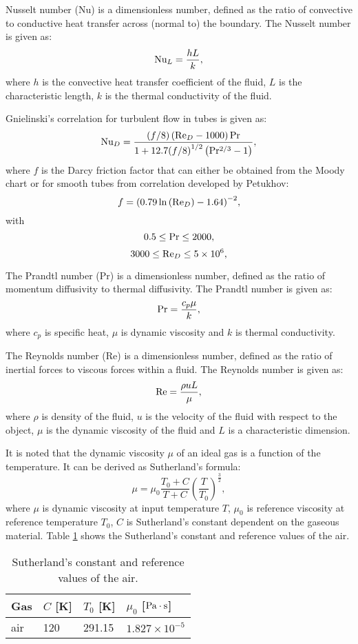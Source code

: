 Nusselt number (Nu) is a dimensionless number, defined as the ratio of convective to conductive heat transfer across (normal to) the boundary.
The Nusselt number is given as:
\[{\rm{N}}{{\rm{u}}_L} = \frac{{hL}}{k},\]
where $h$ is the convective heat transfer coefficient of the fluid, $L$ is the characteristic length, $k$ is the thermal conductivity of the fluid.

Gnielinski's correlation for turbulent flow in tubes is given as:
\[{\rm{N}}{{\rm{u}}_D} = \frac{{\left( {f/8} \right)\left( {{\rm{R}}{{\rm{e}}_D} - 1000} \right){\rm{Pr}}}}{{1 + 12.7{{(f/8)}^{1/2}}\left( {{\rm{P}}{{\rm{r}}^{2/3}} - 1} \right)}},\]
where $f$ is the Darcy friction factor that can either be obtained from the Moody chart or for smooth tubes from correlation developed by Petukhov:
\[f = {\left( {0.79\ln \left( {{\rm{R}}{{\rm{e}}_D}} \right) - 1.64} \right)^{ - 2}},\]
with
\[0.5 \le {\rm{Pr}} \le 2000,\]
\[3000 \le {\rm{R}}{{\rm{e}}_D} \le 5 \times {10^6},\]

The Prandtl number (Pr) is a dimensionless number, defined as the ratio of momentum diffusivity to thermal diffusivity.
The Prandtl number is given as:
\[{\rm{Pr}} = \frac{{{c_p}\mu }}{k},\]
where
$c_{p}$ is specific heat, $\mu$ is dynamic viscosity and $k$ is thermal conductivity.

The Reynolds number (Re) is a dimensionless number, defined as the ratio of inertial forces to viscous forces within a fluid.
The Reynolds number is given as:
\[{\rm{Re}} = \frac{{\rho uL}}{\mu },\]
where
$\rho$ is density of the fluid, $u$ is the velocity of the fluid with respect to the object, $\mu$ is the dynamic viscosity of the fluid and $L$ is a characteristic dimension.

It is noted that the dynamic viscosity $\mu$ of an ideal gas is a function of the temperature. It can be derived as Sutherland's formula:
\[\mu  = {\mu _0}\frac{{{T_0} + C}}{{T + C}}{\left( {\frac{T}{{{T_0}}}} \right)^{\frac{3}{2}}},\]
where $\mu$ is dynamic viscosity at input temperature $T$,
$\mu_0$ is reference viscosity at reference temperature $T_0$,
$C$ is Sutherland's constant dependent on the gaseous material.
Table \ref{tab:SutherlandConstant} shows the Sutherland's constant and reference values of the air.
\begin{table}[htbp]
  \centering
  \caption{Sutherland's constant and reference values of the air.}
    \begin{tabular}{p{2cm}p{2cm}p{2cm}p{3cm}}
    \toprule
    Gas   & $C$ [K] & $T_0$ [K] & $\mu_0$ [$\rm{Pa\cdot s}$] \\
    \midrule
    air   & 120   & 291.15 & $1.827\times 10^{-5}$ \\
    \bottomrule
    \end{tabular}%
  \label{tab:SutherlandConstant}%
\end{table}%

